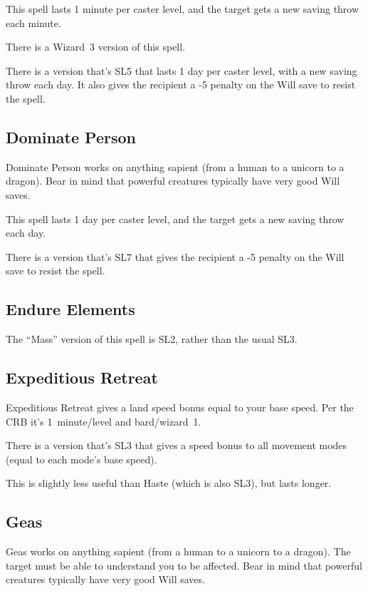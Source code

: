 This spell lasts 1 minute per caster level, and the target gets a new
saving throw each minute.

There is a Wizard~3 version of this spell.

There is a version that's SL5 that lasts 1 day per caster level, with a new
saving throw each day. It also gives the recipient a -5 penalty on the Will
save to resist the spell.
%

%
\subsection{Dominate Person}

Dominate Person works on anything sapient (from a human to a unicorn to a
dragon). Bear in mind that powerful creatures typically have very good Will
saves.

This spell lasts 1 day per caster level, and the target gets a new saving
throw each day.

There is a version that's SL7 that gives the recipient a -5 penalty on the
Will save to resist the spell.
%

%
\subsection{Endure Elements}

The ``Mass'' version of this spell is SL2, rather than the usual SL3.

%
\subsection{Expeditious Retreat}

Expeditious Retreat gives a land speed bonus equal to your base speed.
Per the CRB it's 1~minute/level and bard/wizard~1.

There is a version that's SL3 that gives a speed bonus to all movement
modes (equal to each mode's base speed).

This is slightly less useful than Haste (which is also SL3), but lasts
longer.
%

%
\subsection{Geas}

Geas works on anything sapient (from a human to a unicorn to a dragon).
The target must be able to understand you to be affected. Bear in mind that
powerful creatures typically have very good Will saves.

